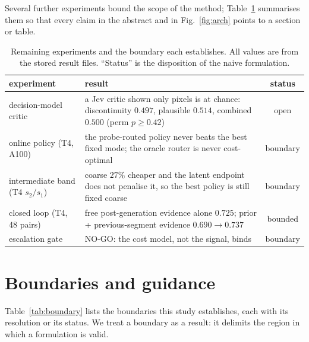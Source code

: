 \documentclass[review]{cas-sc}          %
\begin{document}
Several further experiments bound the scope of the method; Table~\ref{tab:extra} summarises them so that
every claim in the abstract and in Fig.~\ref{fig:arch} points to a section or table.

\begin{table}
  \centering
  \caption{Remaining experiments and the boundary each establishes. All values are from the stored result
  files. ``Status'' is the disposition of the naive formulation.}
  \label{tab:extra}
  \footnotesize
  \setlength{\tabcolsep}{3pt}
  \begin{tabular}{p{}p{}c}
    \toprule
    experiment & result & status \\
    \midrule
    decision-model critic & a Jev critic shown only pixels is at chance: discontinuity $0.497$, plausible
    $0.514$, combined $0.500$ (perm $p \ge 0.42$) & open \\
    online policy (T4, A100) & the probe-routed policy never beats the best fixed mode; the oracle router
    is never cost-optimal & boundary \\
    intermediate band (T4 $s_2/s_1$) & coarse $27\%$ cheaper and the latent endpoint does not penalise it,
    so the best policy is still fixed coarse & boundary \\
    closed loop (T4, 48 pairs) & free post-generation evidence alone $0.725$; prior + previous-segment
    evidence $0.690 \rightarrow 0.737$ & bounded \\
    escalation gate & NO-GO: the cost model, not the signal, binds & boundary \\
    \bottomrule
  \end{tabular}
\end{table}

\section{Boundaries and guidance}
\label{sec:boundaries}

Table~\ref{tab:boundary} lists the boundaries this study establishes, each with its resolution or its
status. We treat a boundary as a result: it delimits the region in which a formulation is valid.
\end{document}
